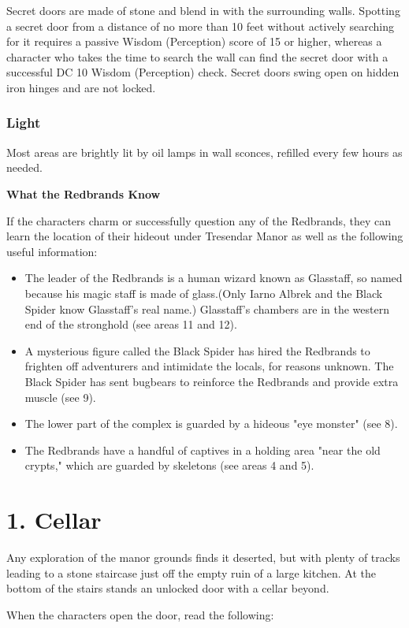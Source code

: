 \documentclass[10pt,a4paper,twoside,bg=print,twocolumn,openany,nodeprecatedcode]{dndbook}
\begin{document}
Secret doors are made of stone and blend in with the surrounding walls. Spotting a secret door from a distance of no more than 10 feet without actively searching for it requires a passive Wisdom (Perception) score of 15 or higher, whereas a character who takes the time to search the wall can find the secret door with a successful DC 10 Wisdom (Perception) check. Secret doors swing open on hidden iron hinges and are not locked.

\subsubsection{Light}
Most areas are brightly lit by oil lamps in wall sconces, refilled every few hours as needed.

\textbf{What the Redbrands Know}

If the characters charm or successfully question any of the Redbrands, they can learn the location of their hideout under Tresendar Manor as well as the following useful information:


\begin{itemize}
\item The leader of the Redbrands is a human wizard known as Glasstaff, so named because his magic staff is made of glass.(Only Iarno Albrek and the Black Spider know Glasstaff's real name.) Glasstaff's chambers are in the western end of the stronghold (see areas 11 and 12).
\item A mysterious figure called the Black Spider has hired the Redbrands to frighten off adventurers and intimidate the locals, for reasons unknown. The Black Spider has sent bugbears to reinforce the Redbrands and provide extra muscle (see 9).
\item The lower part of the complex is guarded by a hideous "eye monster" (see 8).
\item The Redbrands have a handful of captives in a holding area "near the old crypts," which are guarded by skeletons (see areas 4 and 5).
\end{itemize}

\section{1. Cellar}
Any exploration of the manor grounds finds it deserted, but with plenty of tracks leading to a stone staircase just off the empty ruin of a large kitchen. At the bottom of the stairs stands an unlocked door with a cellar beyond.

When the characters open the door, read the following:
\end{document}

